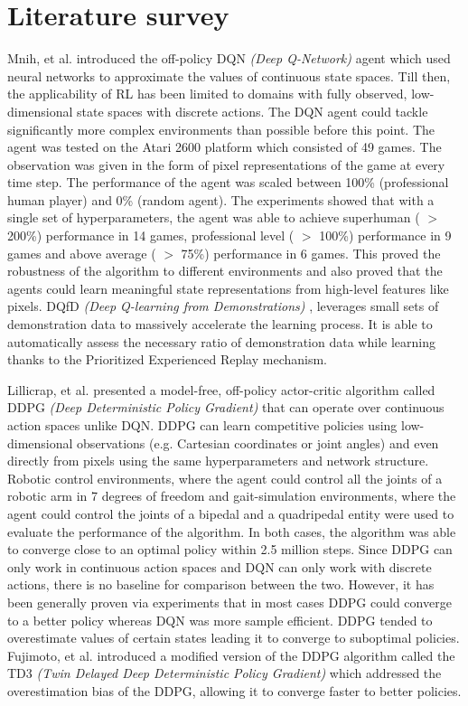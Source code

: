 \documentclass[12pt,a4paper]{article}
\begin{document}
\section{Literature survey}
Mnih, et al. \cite{dqn} introduced the off-policy DQN \textit{(Deep Q-Network)} 
agent which used neural networks to approximate the values of continuous state 
spaces. Till then, the applicability of RL has been limited to domains with fully 
observed, low-dimensional state spaces with discrete actions. The DQN agent could 
tackle significantly more complex environments than possible before this point. The 
agent was tested on the Atari 2600 platform which consisted of 49 games. The 
observation was given in the form of pixel representations of the game at every 
time step. The performance of the agent was scaled between 100\% (professional 
human player) and 0\% (random agent). The experiments showed that with a single 
set of hyperparameters, the agent was able to achieve superhuman ( $>$ 200\%) 
performance in 14 games, professional level ( $>$ 100\%) performance in 9 games
and above average ( $>$ 75\%) performance in 6 games. This proved the robustness 
of the algorithm to different environments and also proved that the agents could 
learn meaningful state representations from high-level features like pixels. 
DQfD \textit{(Deep Q-learning from Demonstrations)} \cite{dqdf}, leverages small 
sets of demonstration data to massively accelerate the learning process. It is 
able to automatically assess the necessary ratio of demonstration data while 
learning thanks to the Prioritized Experienced Replay \cite{per} mechanism. 

Lillicrap, et al. \cite{ddpg} presented a model-free, off-policy actor-critic
algorithm called DDPG \textit{(Deep Deterministic Policy Gradient)} that can 
operate over continuous action spaces unlike DQN. DDPG can learn competitive 
policies using low-dimensional observations (e.g. Cartesian coordinates or joint 
angles) and even directly from pixels using the same hyperparameters and network 
structure. Robotic control environments, where the agent could control all the 
joints of a robotic arm in 7 degrees of freedom and gait-simulation environments, 
where the agent could control the joints of a bipedal and a quadripedal entity 
were used to evaluate the performance of the algorithm. In both cases, the 
algorithm was able to converge close to an optimal policy within 2.5 million 
steps. Since DDPG can only work in continuous action spaces and DQN can only 
work with discrete actions, there is no baseline for comparison between the two. 
However, it has been generally proven via experiments that in most cases DDPG 
could converge to a better policy whereas DQN was more sample efficient. DDPG 
tended to overestimate values of certain states leading it to converge to 
suboptimal policies. Fujimoto, et al. \cite{td3} introduced
a modified version of the DDPG algorithm called the TD3 \textit{(Twin Delayed Deep Deterministic Policy Gradient)} which addressed the overestimation bias of the DDPG, allowing it to converge faster to better policies.
\linebreak
\end{document}
